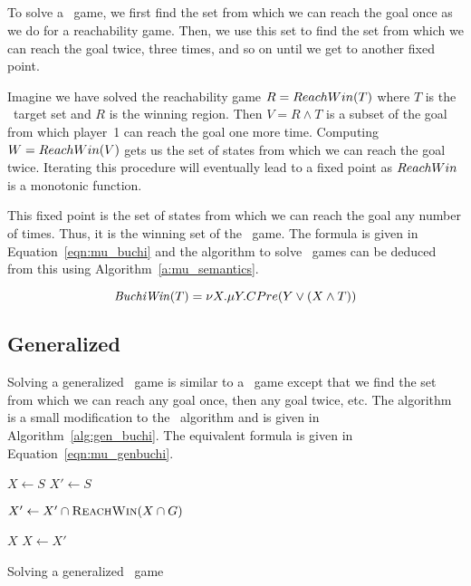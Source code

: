 \subsection{\buchi}

To solve a \buchi\ game, we first find the set from which we can reach the goal once as we do for a reachability game. Then, we use this set to find the set from which we can reach the goal twice, three times, and so on until we get to another fixed point. 

Imagine we have solved the reachability game $R = ReachWin(T)$ where $T$ is the \buchi\ target set and $R$ is the winning region. Then $V = R \wedge T$ is a subset of the goal from which player~1 can reach the goal one more time. Computing $W = ReachWin(V)$ gets us the set of states from which we can reach the goal twice. Iterating this procedure will eventually lead to a fixed point as $ReachWin$ is a monotonic function.

This fixed point is the set of states from which we can reach the goal any number of times. Thus, it is the winning set of the \buchi\ game. The \mucalc formula is given in Equation~\ref{eqn:mu_buchi} and the algorithm to solve \buchi\ games can be deduced from this using Algorithm~\ref{a:mu_semantics}.

\begin{equation}
    \mathit{BuchiWin}(T) = \nu X. \mu Y. CPre(Y \vee (X \wedge T))
\label{eqn:mu_buchi}
\end{equation}

\subsection{Generalized \buchi}

Solving a generalized \buchi\ game is similar to a \buchi\ game except that we find the set from which we can reach any goal once, then any goal twice, etc. The algorithm is a small modification to the \buchi\ algorithm and is given in Algorithm~\ref{alg:gen_buchi}. The equivalent \mucalc formula is given in Equation~\ref{eqn:mu_genbuchi}.

\begin{algorithm}[t]
\begin{algorithmic}
\State $X \gets S$
\Loop
\State $X' \gets S$

\State $X' \gets X' \cap \Call{\reachFun}{X \cap G}$
\EndFor

\State\Return $X$\EndIf
\State $X \gets X'$

\EndLoop
\EndFunction
\end{algorithmic}
\caption{Solving a generalized \buchi\ game}
\label{alg:gen_buchi}
\end{algorithm}

